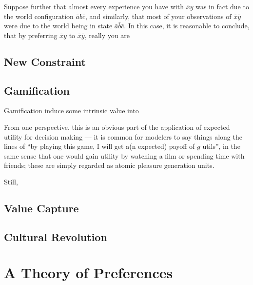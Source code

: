 \documentclass{book}
\begin{document}
	Suppose further that almost every experience you have with $\bar x y$ was in fact due to the world configuration $\bar a b \bar c$, and similarly, that most of your observations of $\bar x \bar y$ were due to the world being in state $\bar a \bar b \bar c$. In this case, it is reasonable to conclude, that by preferring $\bar x y$ to $\bar x \bar y$, really you are 
	
	
	\section{New Constraint}
	
	\section{Gamification}
	Gamification induce some intrinsic value into 
	
	From one perspective, this is an obvious part of the application of expected utility for decision making --- it is common for modelers to say things along the lines of ``by playing this game, I will get a(n expected) payoff of $g$ utils'', in the same sense that one would gain utility by watching a film or spending time with friends; these are simply regarded as atomic pleasure generation units.
	
	Still, 
	
	\section{Value Capture}
	
	
	\section{Cultural Revolution}
	
	
	
	

	\chapter{A Theory of Preferences}
	
\end{document}

